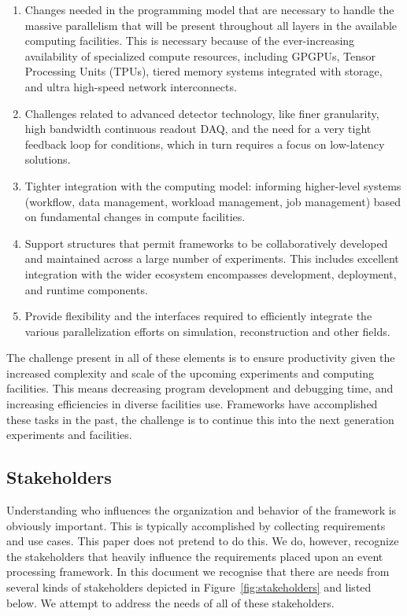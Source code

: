 \documentclass[12pt,a4paper]{article}
\begin{document}
\begin{enumerate}
\item
    Changes needed in the programming model that are necessary to
    handle the massive parallelism that will be present throughout all
    layers in the available computing facilities. This is necessary
    because of the ever-increasing availability of specialized compute
    resources, including GPGPUs, Tensor Processing Units (TPUs),
    tiered memory systems integrated with storage, and ultra
    high-speed network interconnects.
\item
    Challenges related to advanced detector technology, like finer
    granularity, high bandwidth continuous readout DAQ, and the need
    for a very tight feedback loop for conditions, which in turn
    requires a focus on low-latency solutions.
\item
    Tighter integration with the computing model: informing
    higher-level systems (workflow, data management, workload
    management, job management) based on fundamental changes in
    compute facilities.
\item
    Support structures that permit frameworks to be collaboratively
    developed and maintained across a large number of
    experiments. This includes excellent integration with the wider
    ecosystem encompasses development, deployment, and runtime
    components.
\item
    Provide flexibility and the interfaces required to efficiently
    integrate the various parallelization efforts on simulation,
    reconstruction and other fields.
\end{enumerate}

The challenge present in all of these elements is to ensure
productivity given the increased complexity and scale of the upcoming
experiments and computing facilities. This means decreasing program
development and debugging time, and increasing efficiencies in diverse
facilities use.  Frameworks have accomplished these tasks in the past,
the challenge is to continue this into the next generation experiments
and facilities.

\subsection{Stakeholders}
\label{sec:stakeholders}

Understanding who influences the organization and behavior of the
framework is obviously important. This is typically accomplished by
collecting requirements and use cases. This paper does not pretend to
do this. We do, however, recognize the stakeholders that heavily
influence the requirements placed upon an event processing
framework. In this document we recognise that there are needs from
several kinds of stakeholders depicted in
Figure~\ref{fig:stakeholders} and listed below.  We attempt to address
the needs of all of these stakeholders.
\end{document}
